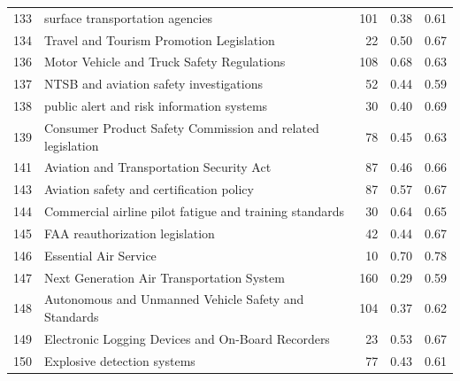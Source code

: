\begin{longtable}{rlrrr}
133 & surface transportation agencies & 101 & 0.38 & 0.61 \\
134 & Travel and Tourism Promotion Legislation & 22 & 0.50 & 0.67 \\
136 & Motor Vehicle and Truck Safety Regulations & 108 & 0.68 & 0.63 \\
137 & NTSB and aviation safety investigations & 52 & 0.44 & 0.59 \\
138 & public alert and risk information systems & 30 & 0.40 & 0.69 \\
139 & Consumer Product Safety Commission and related legislation & 78 & 0.45 & 0.63 \\
141 & Aviation and Transportation Security Act & 87 & 0.46 & 0.66 \\
143 & Aviation safety and certification policy & 87 & 0.57 & 0.67 \\
144 & Commercial airline pilot fatigue and training standards & 30 & 0.64 & 0.65 \\
145 & FAA reauthorization legislation & 42 & 0.44 & 0.67 \\
146 & Essential Air Service & 10 & 0.70 & 0.78 \\
147 & Next Generation Air Transportation System & 160 & 0.29 & 0.59 \\
148 & Autonomous and Unmanned Vehicle Safety and Standards & 104 & 0.37 & 0.62 \\
149 & Electronic Logging Devices and On-Board Recorders & 23 & 0.53 & 0.67 \\
150 & Explosive detection systems & 77 & 0.43 & 0.61 \\
\end{longtable}
